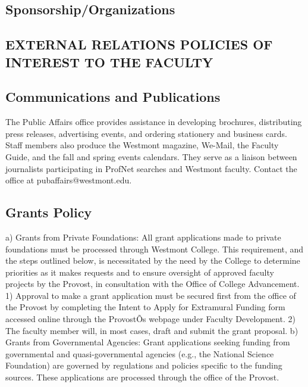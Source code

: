 \documentclass[letterpaper, 11pt]{article}
\begin{document}
	\subsection{Sponsorship/Organizations}

	\subsection{EXTERNAL RELATIONS POLICIES OF INTEREST TO THE FACULTY}
	\subsection{Communications and Publications}
		The Public Affairs office provides assistance in developing brochures, distributing press releases, advertising events, and ordering stationery and business cards. Staff members also produce the Westmont magazine, We-Mail, the Faculty Guide, and the fall and spring events calendars.  They serve as a liaison between journalists participating in ProfNet searches and Westmont faculty. Contact the office at pubaffairs@westmont.edu.
	\subsection{Grants Policy}
		a) Grants from Private Foundations:  All grant applications made to private foundations must be processed through Westmont College.  This requirement, and the steps outlined below, is necessitated by the need by the College to determine priorities as it makes requests and to ensure oversight of approved faculty projects by the Provost, in consultation with the Office of College Advancement.
		1) Approval to make a grant application must be secured first from the office of the Provost by completing the Intent to Apply for Extramural Funding form accessed online through the ProvostÕs webpage under Faculty Development.
		2)  The faculty member will, in most cases, draft and submit the grant proposal.
		b) Grants from Governmental Agencies:  Grant applications seeking funding from governmental and quasi-governmental agencies (e.g., the National Science Foundation) are governed by regulations and policies specific to the funding sources. These applications are processed through the office of the Provost.
\end{document}
